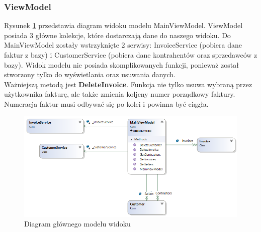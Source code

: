 \subsubsection{ViewModel}
Rysunek \ref{fig:MainViewModelDiagram} przedstawia diagram widoku modelu MainViewModel. ViewModel posiada 3 główne kolekcje, które dostarczają dane do naszego widoku. Do MainViewModel zostały wstrzyknięte 2 serwisy: InvoiceService (pobiera dane faktur z bazy) i CustomerService (pobiera dane kontrahentów oraz sprzedawców z bazy). Widok modelu nie posiada skomplikowanych funkcji, ponieważ został stworzony tylko do wyświetlania oraz usuwania danych. \\
Ważniejszą metodą jest \textbf{DeleteInvoice}. Funkcja nie tylko usuwa wybraną przez użytkownika fakturę, ale także zmienia koljeny numer porządkowy faktury. Numeracja faktur musi odbywać się po kolei i powinna być ciągła.

\begin{figure}[ht!]
  \includegraphics[width=\linewidth]{Rysunki/MainViewModelDiagram.png}
  \caption{Diagram głównego modelu widoku}
  \label{fig:MainViewModelDiagram}
\end{figure}

